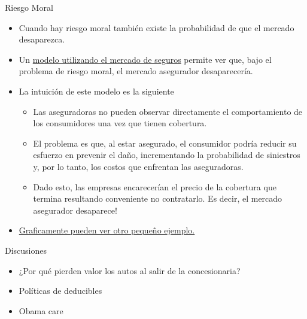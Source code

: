 \documentclass{beamer}
\begin{document}
\begin{frame}{Riesgo Moral}
\label{volver2}
    \begin{itemize}
        \item Cuando hay riesgo moral también existe la probabilidad de que el mercado desaparezca.
        \item Un \hyperlink{htres}{modelo utilizando el mercado de seguros} permite ver que, bajo el problema de riesgo moral, el mercado asegurador desaparecería.
        \item La intuición de este modelo es la siguiente
         \begin{itemize}
            \item Las aseguradoras no pueden observar directamente el comportamiento de los consumidores una vez que tienen cobertura.
            \item El problema es que, al estar asegurado, el consumidor podría reducir su esfuerzo en prevenir el daño, incrementando la probabilidad de siniestros y, por lo tanto, los costos que enfrentan las aseguradoras.
            \item Dado esto, las empresas encarecerían el precio de la cobertura que termina resultando conveniente no contratarlo. Es decir, el mercado asegurador desaparece!
        \end{itemize}
        \item \hyperlink{moralhazard}{Graficamente pueden ver otro pequeño ejemplo.}
\end{itemize}
\end{frame}

\begin{frame}{Discusiones}
    \begin{itemize}
        \item ¿Por qué pierden valor los autos al salir de la concesionaria? \vspace{1mm}
        \item Políticas de deducibles \vspace{1mm}
        \item Obama care
    \end{itemize}
\end{frame}
\end{document}
